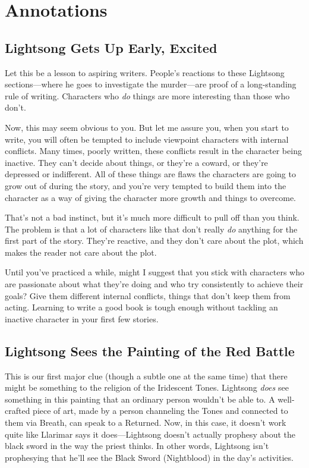 \section*{Annotations}

\subsection*{Lightsong Gets Up Early, Excited}

Let this be a lesson to aspiring writers. People’s reactions to these Lightsong sections—where he goes to investigate the murder—are proof of a long-standing rule of writing. Characters who \textit{do} things are more interesting than those who don’t.

Now, this may seem obvious to you. But let me assure you, when you start to write, you will often be tempted to include viewpoint characters with internal conflicts. Many times, poorly written, these conflicts result in the character being inactive. They can’t decide about things, or they’re a coward, or they’re depressed or indifferent. All of these things are flaws the characters are going to grow out of during the story, and you’re very tempted to build them into the character as a way of giving the character more growth and things to overcome.

That’s not a bad instinct, but it’s much more difficult to pull off than you think. The problem is that a lot of characters like that don’t really \textit{do} anything for the first part of the story. They’re reactive, and they don’t care about the plot, which makes the reader not care about the plot.

Until you’ve practiced a while, might I suggest that you stick with characters who are passionate about what they’re doing and who try consistently to achieve their goals? Give them different internal conflicts, things that don’t keep them from acting. Learning to write a good book is tough enough without tackling an inactive character in your first few stories.

\subsection*{Lightsong Sees the Painting of the Red Battle}

This is our first major clue (though a subtle one at the same time) that there might be something to the religion of the Iridescent Tones. Lightsong \textit{does} see something in this painting that an ordinary person wouldn’t be able to. A well-crafted piece of art, made by a person channeling the Tones and connected to them via Breath, can speak to a Returned. Now, in this case, it doesn’t work quite like Llarimar says it does—Lightsong doesn’t actually prophesy about the black sword in the way the priest thinks. In other words, Lightsong isn’t prophesying that he’ll see the Black Sword (Nightblood) in the day’s activities.

